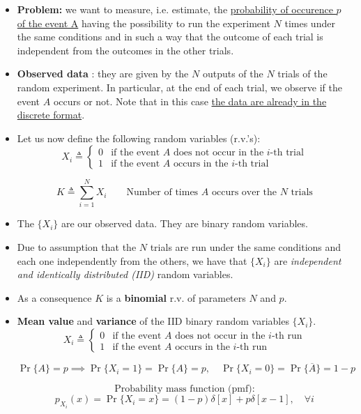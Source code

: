 \begin{itemize}
    \item \textbf{Problem:} we want to measure, i.e. estimate, the \underline{probability of occurence \(p\) of the event A} having the possibility to run the experiment \(N\) times under the same conditions and in such a way that the outcome of each trial is independent from the outcomes in the other trials.
    \item \textbf{Observed data} : they are given by the \(N\) outputs of the \(N\) trials of the random experiment. In particular, at the end of each trial, we observe if the event \(A\) occurs or not. Note that in this case \underline{the data are already in the discrete format}.
    \item Let us now define the following random variables (r.v.'s):
        \[
X_i \triangleq
\begin{cases}
0 & \text{if the event } A \text{ does not occur in the } i\text{-th trial} \\
1 & \text{if the event } A \text{ occurs in the } i\text{-th trial}
\end{cases}
\]

\[
K \triangleq \sum_{i=1}^{N} X_i \qquad \text{Number of times } A \text{ occurs over the } N \text{ trials}
\]
    \item The \(\{X_i\}\) are our observed data. They are binary random variables.
    \item Due to assumption that the \(N\) trials are run under the same conditions and each one independently from the others, we have that \(\{X_i\}\) are \textit{independent and identically distributed (IID)} random variables.
    \item As a consequence \(K\) is a \textbf{binomial} r.v. of parameters \(N\) and \(p\).
    \item \textbf{Mean value} and \textbf{variance} of the IID binary random variables \(\{X_i\}\).
    \[
X_i \triangleq
\begin{cases}
0 & \text{if the event } A \text{ does not occur in the } i\text{-th run} \\
1 & \text{if the event } A \text{ occurs in the } i\text{-th run}
\end{cases}
\]

\[
\Pr\{A\} = p \implies \Pr\{X_i = 1\} = \Pr\{A\} = p, \quad \Pr\{X_i = 0\} = \Pr\{\overline{A}\} = 1 - p
\]

\[
\text{Probability mass function (pmf):}
\]
\[
p_{X_i}(x) = \Pr\{X_i = x\} = (1-p)\delta[x] + p\delta[x-1], \quad \forall i
\]
\hspace{1cm} 


\end{itemize}

